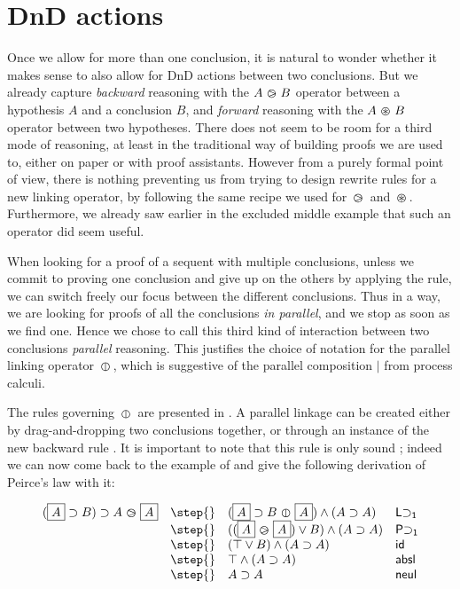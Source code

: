 \section{DnD actions}

Once we allow for more than one conclusion, it is natural to wonder whether it
makes sense to also allow for DnD actions between two conclusions. But we
already capture \emph{backward} reasoning with the $A \operatorname{\,\varogreaterthan\,} B$ operator between
a hypothesis $A$ and a conclusion $B$, and \emph{forward} reasoning with the $A
\operatorname{\,\varoast\,} B$ operator between two hypotheses. There does not seem to be room for a
third mode of reasoning, at least in the traditional way of building proofs we
are used to, either on paper or with proof assistants. However from a purely
formal point of view, there is nothing preventing us from trying to design
rewrite rules for a new linking operator, by following the same recipe we used
for $\operatorname{\,\varogreaterthan\,}$ and $\operatorname{\,\varoast\,}$. Furthermore, we already saw earlier in the excluded
middle example that such an operator did seem useful.

When looking for a proof of a sequent with multiple conclusions, unless we
commit to proving one conclusion and give up on the others by applying the
{} rule, we can switch freely our focus between the different
conclusions. Thus in a way, we are looking for proofs of all the conclusions
\emph{in parallel}, and we stop as soon as we find one. Hence we chose to
call this third kind of interaction between two conclusions \emph{parallel}
reasoning. This justifies the choice of notation for the parallel linking
operator $\operatorname{\,\varobar\,}$, which is suggestive of the parallel composition $\mid$ from
process calculi.

The rules governing $\operatorname{\,\varobar\,}$ are presented in . A parallel
linkage can be created either by drag-and-dropping two conclusions together, or
through an instance of the new backward rule {}. It is
important to note that this rule is only sound \emph{}; indeed we can
now come back to the example of  and give the following
derivation of Peirce's law with it:

$$
\begin{array}{llll}
  (\select{A} \limp B) \limp A \back \select{A}
  &\step{}& (\select{A} \limp B \para \select{A}) \land (A \limp A) &\mathsf{L{\limp}_1} \\
  &\step{}& ((\select{A} \back \select{A}) \lor B) \land (A \limp A) &\mathsf{P{\limp}_1} \\
  &\step{}& (\top \lor B) \land (A \limp A) &\mathsf{id} \\
  &\step{}& \top \land (A \limp A) &\mathsf{absl} \\
  &\step{}& A \limp A &\mathsf{neul}
\end{array}
$$

